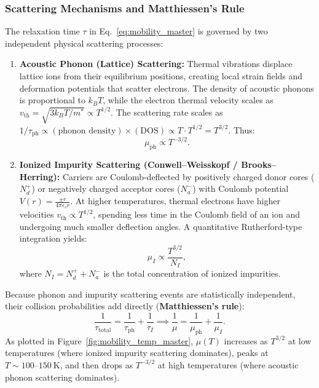 \documentclass[11pt,a4paper]{article}
\begin{document}
\subsubsection{Scattering Mechanisms and Matthiessen's Rule}
The relaxation time $\tau$ in Eq.~\eqref{eq:mobility_master} is governed by two independent physical scattering processes:
\begin{enumerate}
    \item \textbf{Acoustic Phonon (Lattice) Scattering:} Thermal vibrations displace lattice ions from their equilibrium positions, creating local strain fields and deformation potentials that scatter electrons. The density of acoustic phonons is proportional to $k_B T$, while the electron thermal velocity scales as $v_{\mathrm{th}} = \sqrt{3k_B T/m^*} \propto T^{1/2}$. The scattering rate scales as $1/\tau_{\mathrm{ph}} \propto (\text{phonon density})\times(\text{DOS}) \propto T \cdot T^{1/2} = T^{3/2}$. Thus:
    \begin{equation}
        \mu_{\mathrm{ph}} \propto T^{-3/2}.
    \end{equation}
    \item \textbf{Ionized Impurity Scattering (Conwell--Weisskopf / Brooks--Herring):} Carriers are Coulomb-deflected by positively charged donor cores ($N_d^+$) or negatively charged acceptor cores ($N_a^-$) with Coulomb potential $V(r) = \frac{\pm e}{4\pi\epsilon_s r}$. At higher temperatures, thermal electrons have higher velocities $v_{\mathrm{th}} \propto T^{1/2}$, spending less time in the Coulomb field of an ion and undergoing much smaller deflection angles. A quantitative Rutherford-type integration yields:
    \begin{equation}
        \mu_I \propto \frac{T^{3/2}}{N_I},
    \end{equation}
    where $N_I = N_d^+ + N_a^-$ is the total concentration of ionized impurities.
\end{enumerate}

Because phonon and impurity scattering events are statistically independent, their collision probabilities add directly (\textbf{Matthiessen's rule}):
\begin{equation}
    \boxed{\frac{1}{\tau_{\mathrm{total}}} = \frac{1}{\tau_{\mathrm{ph}}} + \frac{1}{\tau_I} \implies \frac{1}{\mu} = \frac{1}{\mu_{\mathrm{ph}}} + \frac{1}{\mu_I}.}
    \label{eq:matthiessen_master}
\end{equation}
As plotted in Figure~\ref{fig:mobility_temp_master}, $\mu(T)$ increases as $T^{3/2}$ at low temperatures (where ionized impurity scattering dominates), peaks at $T \sim 100\text{--}150\ \mathrm{K}$, and then drops as $T^{-3/2}$ at high temperatures (where acoustic phonon scattering dominates).
\end{document}
